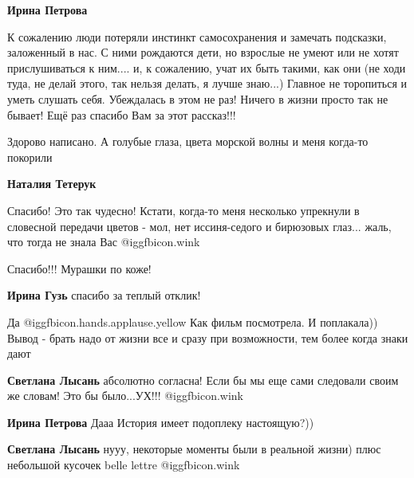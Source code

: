 \begin{itemize}
\begin{itemize}
\textbf{Ирина Петрова} 

К сожалению люди потеряли инстинкт самосохранения и замечать
подсказки, заложенный в нас. С ними рождаются дети, но взрослые не умеют или не
хотят прислушиваться к ним.... и, к сожалению, учат их быть такими, как они (не
ходи туда, не делай этого, так нельзя делать, я лучше знаю...) Главное не
торопиться и уметь слушать себя. Убеждалась в этом не раз! Ничего в жизни
просто так не бывает! Ещё раз спасибо Вам за этот рассказ!!!

\end{itemize} %

Здорово написано. А голубые глаза, цвета морской волны и меня когда-то покорили

\begin{itemize} %
\textbf{Наталия Тетерук} 

Спасибо! Это так чудесно! Кстати, когда-то меня несколько упрекнули в словесной
передачи цветов - мол, нет иссиня-седого и бирюзовых глаз... жаль, что тогда не
знала Вас @igg{fbicon.wink} 

\end{itemize} %

Спасибо!!! Мурашки по коже!

\textbf{Ирина Гузь} спасибо за теплый отклик!

Да  @igg{fbicon.hands.applause.yellow} 
Как фильм посмотрела. И поплакала))
Вывод - брать надо от жизни все и сразу при возможности, тем более когда знаки дают

\begin{itemize} %
\textbf{Светлана Лысань} абсолютно согласна! Если бы мы еще сами следовали своим же словам! Это бы было...УХ!!! @igg{fbicon.wink} 

\textbf{Ирина Петрова}
Дааа
История имеет подоплеку настоящую?))

\textbf{Светлана Лысань} нууу, некоторые моменты были в реальной жизни) плюс небольшой кусочек belle lettre @igg{fbicon.wink} 
\end{itemize} %

\end{itemize} %
